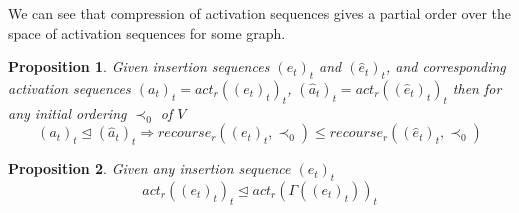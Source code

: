 \documentclass{article}
\newtheorem{proposition}{Proposition}
\begin{document}
We can see that compression of activation sequences gives a partial order over the space of activation sequences for some graph.

\begin{proposition}
Given insertion sequences $(e_t)_t$ and $(\hat{e}_t)_t$, and corresponding activation sequences $(a_t)_t = act_r((e_t)_t)_t$, $(\hat{a}_t)_t = act_r((\hat{e}_t)_t)_t$ then for any initial ordering $\prec_0$ of $V$
\[ (a_t)_t \trianglelefteq (\hat{a}_t)_t  \Rightarrow recourse_r((e_t)_t,\prec_0) \leq recourse_r((\hat{e}_t)_t, \prec_0) \]
\end{proposition}

\begin{proposition}
Given any insertion sequence $(e_t)_t$
\[ act_r((e_t)_t)_t \trianglelefteq act_r(\Gamma((e_t)_t))_t \]
\end{proposition}
\end{document}
